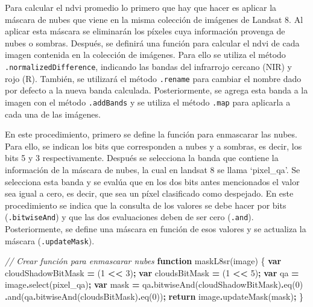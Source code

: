 \documentclass[
  12pt,
  letterpaper,
  twoside]{book}
\newenvironment{Shaded}{\begin{snugshade}}{\end{snugshade}}
\newcommand{\CommentTok}[1]{\textcolor[rgb]{0.56,0.35,0.01}{\textit{#1}}}
\newcommand{\ControlFlowTok}[1]{\textcolor[rgb]{0.13,0.29,0.53}{\textbf{#1}}}
\newcommand{\DecValTok}[1]{\textcolor[rgb]{0.00,0.00,0.81}{#1}}
\newcommand{\FunctionTok}[1]{\textcolor[rgb]{0.00,0.00,0.00}{#1}}
\newcommand{\KeywordTok}[1]{\textcolor[rgb]{0.13,0.29,0.53}{\textbf{#1}}}
\newcommand{\NormalTok}[1]{#1}
\newcommand{\OperatorTok}[1]{\textcolor[rgb]{0.81,0.36,0.00}{\textbf{#1}}}
\newcommand{\StringTok}[1]{\textcolor[rgb]{0.31,0.60,0.02}{#1}}
\begin{document}
Para calcular el ndvi promedio lo primero que hay que hacer es aplicar la máscara de nubes que viene en la misma colección de imágenes de Landsat 8. Al aplicar esta máscara se eliminarán los píxeles cuya información provenga de nubes o sombras. Después, se definirá una función para calcular el ndvi de cada imagen contenida en la colección de imágenes. Para ello se utiliza el método \texttt{.normalizedDifference}, indicando las bandas del infrarrojo cercano (NIR) y rojo (R). También, se utilizará el método \texttt{.rename} para cambiar el nombre dado por defecto a la nueva banda calculada. Posteriormente, se agrega esta banda a la imagen con el método \texttt{.addBands} y se utiliza el método \texttt{.map} para aplicarla a cada una de las imágenes.

En este procedimiento, primero se define la función para enmascarar las nubes. Para ello, se indican los bits que corresponden a nubes y a sombras, es decir, los bits 5 y 3 respectivamente. Después se selecciona la banda que contiene la información de la máscara de nubes, la cual en landsat 8 se llama `pixel\_qa'. Se selecciona esta banda y se evalúa que en los dos bits antes mencionados el valor sea igual a cero, es decir, que sea un píxel clasificado como despejado. En este procedimiento se indica que la consulta de los valores se debe hacer por bits (\texttt{.bitwiseAnd}) y que las dos evaluaciones deben de ser cero (\texttt{.and}). Posteriormente, se define una máscara en función de esos valores y se actualiza la máscara (\texttt{.updateMask}).

\begin{Shaded}
\begin{Highlighting}[]
\CommentTok{// Crear función para enmascarar nubes}
\KeywordTok{function} \FunctionTok{maskL8sr}\NormalTok{(image) \{}
  \KeywordTok{var}\NormalTok{ cloudShadowBitMask }\OperatorTok{=}\NormalTok{ (}\DecValTok{1} \OperatorTok{\textless{}\textless{}} \DecValTok{3}\NormalTok{)}\OperatorTok{;}
  \KeywordTok{var}\NormalTok{ cloudsBitMask }\OperatorTok{=}\NormalTok{ (}\DecValTok{1} \OperatorTok{\textless{}\textless{}} \DecValTok{5}\NormalTok{)}\OperatorTok{;}
  \KeywordTok{var}\NormalTok{ qa }\OperatorTok{=}\NormalTok{ image}\OperatorTok{.}\FunctionTok{select}\NormalTok{(}\StringTok{\textquotesingle{}pixel\_qa\textquotesingle{}}\NormalTok{)}\OperatorTok{;}
  \KeywordTok{var}\NormalTok{ mask }\OperatorTok{=}\NormalTok{ qa}\OperatorTok{.}\FunctionTok{bitwiseAnd}\NormalTok{(cloudShadowBitMask)}\OperatorTok{.}\FunctionTok{eq}\NormalTok{(}\DecValTok{0}\NormalTok{)}
                 \OperatorTok{.}\FunctionTok{and}\NormalTok{(qa}\OperatorTok{.}\FunctionTok{bitwiseAnd}\NormalTok{(cloudsBitMask)}\OperatorTok{.}\FunctionTok{eq}\NormalTok{(}\DecValTok{0}\NormalTok{))}\OperatorTok{;}
  \ControlFlowTok{return}\NormalTok{ image}\OperatorTok{.}\FunctionTok{updateMask}\NormalTok{(mask)}\OperatorTok{;}
\NormalTok{\}}
\end{Highlighting}
\end{Shaded}
\end{document}
